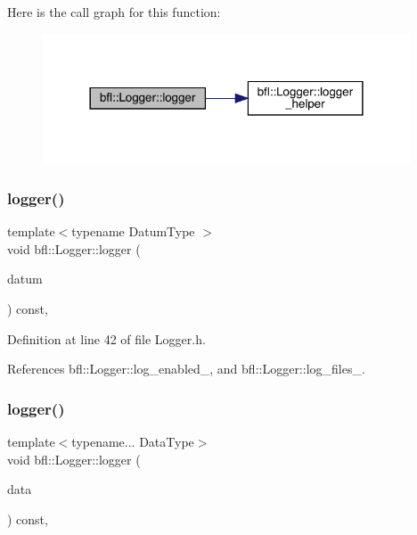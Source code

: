 Here is the call graph for this function\+:
\nopagebreak
\begin{figure}[H]
\begin{center}
\leavevmode
\includegraphics[width=309pt]{classbfl_1_1Logger_aca2086c9256e5c404872b91f7f25b97d_cgraph}
\end{center}
\end{figure}
\mbox{\label{classbfl_1_1Logger_a50b1c109730fa98f66e66f420f0158fe}} 
\subsubsection{\texorpdfstring{logger()}{logger()}\hspace{0.1cm}{\footnotesize\ttfamily [3/4]}}
{\footnotesize\ttfamily template$<$typename Datum\+Type $>$ \\
void bfl\+::\+Logger\+::logger (\begin{DoxyParamCaption}\item[{Datum\+Type}]{datum }\end{DoxyParamCaption}) const\hspace{0.3cm}{\ttfamily [inline]}, {\ttfamily [inherited]}}



Definition at line 42 of file Logger.\+h.



References bfl\+::\+Logger\+::log\+\_\+enabled\+\_\+, and bfl\+::\+Logger\+::log\+\_\+files\+\_\+.

\mbox{\label{classbfl_1_1Logger_a0f0cf7ce956546d94dfb1feb7cebf171}} 
\subsubsection{\texorpdfstring{logger()}{logger()}\hspace{0.1cm}{\footnotesize\ttfamily [4/4]}}
{\footnotesize\ttfamily template$<$typename... Data\+Type$>$ \\
void bfl\+::\+Logger\+::logger (\begin{DoxyParamCaption}\item[{Data\+Type...}]{data }\end{DoxyParamCaption}) const\hspace{0.3cm}{\ttfamily [inline]}, {\ttfamily [inherited]}}



